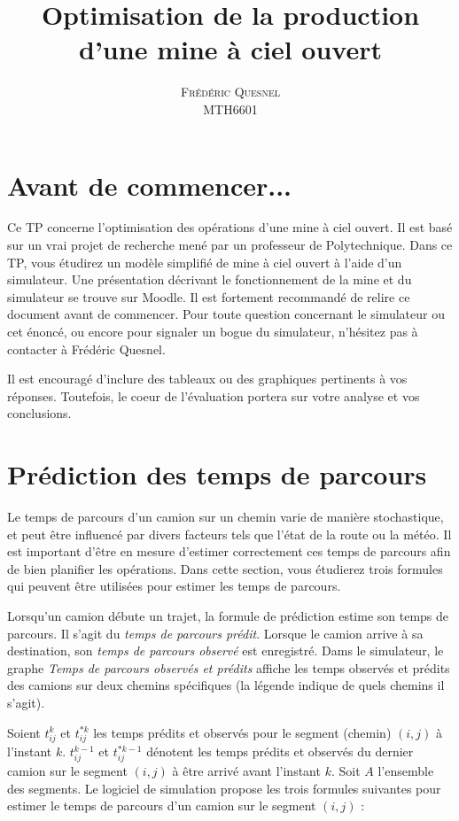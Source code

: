 \documentclass[letterpaper,12pt]{article}
\title{ Optimisation de la production d'une mine à ciel ouvert }
\author{\textsc{\large{Frédéric Quesnel}} \\ MTH6601}
\begin{document}
	
	\maketitle
	
	\setcounter{section}{-1}
	\section{Avant de commencer...}
	Ce TP concerne l'optimisation des opérations d'une mine à ciel ouvert. Il est basé sur un vrai projet de recherche mené par un professeur de Polytechnique. Dans ce TP, vous étudirez un modèle simplifié de mine à ciel ouvert à l'aide d'un simulateur. Une présentation décrivant le fonctionnement de la mine et du simulateur se trouve sur Moodle. Il est fortement recommandé de relire ce document avant de commencer. Pour toute question concernant le simulateur ou cet énoncé, ou encore pour signaler un bogue du simulateur, n'hésitez pas à contacter à Frédéric Quesnel. 
	
	
	Il est encouragé d'inclure des tableaux ou des graphiques pertinents à vos réponses. Toutefois, le coeur de l'évaluation portera sur votre analyse et vos conclusions. 
	
	
	\section{Prédiction des temps de parcours}
	
	Le temps de parcours d’un camion sur un chemin varie de manière stochastique, et peut être influencé par divers facteurs tels que l’état de la route ou la météo. Il est important d'être en mesure d'estimer correctement ces temps de parcours afin de bien planifier les opérations. Dans cette section, vous étudierez trois formules qui peuvent être utilisées pour estimer les temps de parcours. 
	
	Lorsqu'un camion débute un trajet, la formule de prédiction estime son temps de parcours. Il s'agit du \textit{temps de parcours prédit}. Lorsque le camion arrive à sa destination, son \textit{temps de parcours observé} est enregistré. Dams le simulateur, le graphe \textit{Temps de parcours observés et prédits} affiche les temps observés et prédits des camions sur deux chemins spécifiques (la légende indique de quels chemins il s'agit).
	
	
	Soient $t_{ij}^k$ et $t^{*k}_{ij}$ les temps prédits et observés pour le segment (chemin) $(i,j)$ à l'instant $k$. $t_{ij}^{k-1}$ et $t^{*k-1}_{ij}$ dénotent les temps prédits et observés du dernier camion sur le segment $(i, j)$ à être arrivé avant l'instant $k$. Soit $A$ l'ensemble des segments. Le logiciel de simulation propose les trois formules suivantes pour estimer le temps de parcours d’un camion sur le segment $(i,j)$ : 
	
\end{document}
